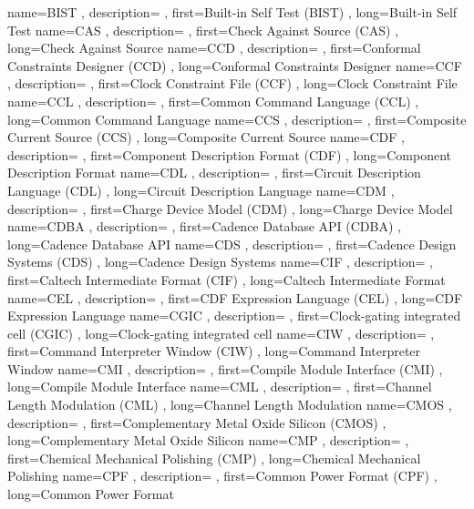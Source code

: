 { name={BIST}
, description={}
, first={Built-in Self Test (BIST)}
, long={Built-in Self Test}
}
{ name={CAS}
, description={}
, first={Check Against Source (CAS)}
, long={Check Against Source}
}
{ name={CCD}
, description={}
, first={Conformal Constraints Designer (CCD)}
, long={Conformal Constraints Designer}
}
{ name={CCF}
, description={}
, first={Clock Constraint File (CCF)}
, long={Clock Constraint File}
}
{ name={CCL}
, description={}
, first={Common Command Language (CCL)}
, long={Common Command Language}
}
{ name={CCS}
, description={}
, first={Composite Current Source (CCS)}
, long={Composite Current Source}
}
{ name={CDF}
, description={}
, first={Component Description Format (CDF)}
, long={Component Description Format}
}
{ name={CDL}
, description={}
, first={Circuit Description Language (CDL)}
, long={Circuit Description Language}
}
{ name={CDM}
, description={}
, first={Charge Device Model (CDM)}
, long={Charge Device Model}
}
{ name={CDBA}
, description={}
, first={Cadence Database API (CDBA)}
, long={Cadence Database API}
}
{ name={CDS}
, description={}
, first={Cadence Design Systems (CDS)}
, long={Cadence Design Systems}
}
{ name={CIF}
, description={}
, first={Caltech Intermediate Format (CIF)}
, long={Caltech Intermediate Format}
}
{ name={CEL}
, description={}
, first={CDF Expression Language (CEL)}
, long={CDF Expression Language}
}
{ name={CGIC}
, description={}
, first={Clock-gating integrated cell (CGIC)}
, long={Clock-gating integrated cell}
}
{ name={CIW}
, description={}
, first={Command Interpreter Window (CIW)}
, long={Command Interpreter Window}
}
{ name={CMI}
, description={}
, first={Compile Module Interface (CMI)}
, long={Compile Module Interface}
}
{ name={CML}
, description={}
, first={Channel Length Modulation (CML)}
, long={Channel Length Modulation}
}
{ name={CMOS}
, description={}
, first={Complementary Metal Oxide Silicon (CMOS)}
, long={Complementary Metal Oxide Silicon}
}
{ name={CMP}
, description={}
, first={Chemical Mechanical Polishing (CMP)}
, long={Chemical Mechanical Polishing}
}
{ name={CPF}
, description={}
, first={Common Power Format (CPF)}
, long={Common Power Format}
}
